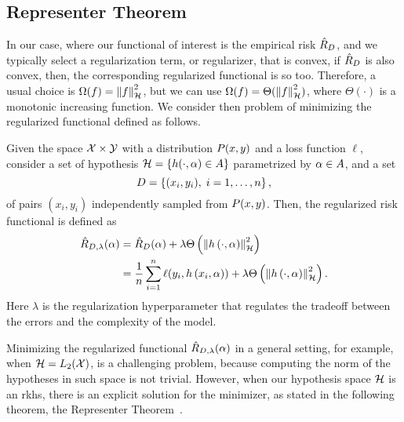 \subsection{Representer Theorem} %
%
In our case, where our functional of interest is the empirical risk $\hat{R}_{D}$, and we typically select a regularization term, or regularizer, that is convex, if $\hat{R}_{D}$ is also convex, then, the corresponding regularized functional is so too. Therefore, a usual choice is $\Omega(f) = \left\lVert f\right\rVert^2_{\mathcal{H}}$, but we can use $\Omega(f) = \Theta(\left\lVert f\right\rVert_{\mathcal{H}}^2)$, where $\Theta(\cdot)$ is a monotonic increasing function.
We consider then problem of minimizing the regularized functional defined as follows.
\begin{definition}
    Given the space $\mathcal{X} \times \mathcal{Y}$ with a distribution $P(x, y)$ and a loss function $\ell$, consider a set of hypothesis $\mathcal{H} = \left\{h(\cdot, \alpha) \in A\right\}$ parametrized by $\alpha \in A$, and a set 
    \begin{equation}
        \nonumber
        D = \left\{(x_i, y_i), \; i=1, \ldots, n\right\} ,
    \end{equation}
    of pairs $(x_i, y_i)$ independently sampled from $P(x, y)$.   
    Then, the regularized risk functional is defined as
    \begin{equation}
        \label{eq:regrisk_def}
        \begin{aligned}
            \regrisk(\param) &= \emprisk(\param) + \lambda \Theta\left(\norm{\hyp{\cdot}{\param}}^2_\hypspace \right) \\
            &= \frac{1}{\nsamples} \sum_{i=1}^\nsamples \ell(y_i, \hyp{x_i}{\param}) + \lambda \Theta\left(\norm{\hyp{\cdot}{\param}}^2_\hypspace \right) .
        \end{aligned}        
    \end{equation}
    Here $\lambda$ is the regularization hyperparameter that regulates the tradeoff between the errors and the complexity of the model.
\end{definition}
%
Minimizing the regularized functional $\hat{R}_{D, \lambda}(\alpha)$ in a general setting, for example, when $\mathcal{H} = L_2(\mathcal{X})$, is a challenging problem, because computing the norm of the hypotheses in such space is not trivial.
%
However, when our hypothesis space $\mathcal{H}$ is an \acrshort{rkhs}, there is an explicit solution for the minimizer, as stated in the following theorem, the Representer Theorem~\citep{ScholkopfHS01}.

